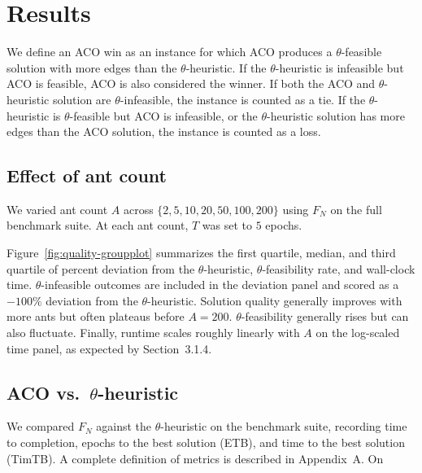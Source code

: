 \documentclass[conference]{IEEEtran}
\begin{document}
\section{Results}


We define an ACO win as an instance for which ACO produces a $\theta$-feasible solution with more edges than the $\theta$-heuristic. If the $\theta$-heuristic is infeasible but ACO is feasible, ACO is also considered the winner. If both the ACO and $\theta$-heuristic solution are $\theta$-infeasible, the instance is counted as a tie. If the $\theta$-heuristic is $\theta$-feasible but ACO is infeasible, or the $\theta$-heuristic solution has more edges than the ACO solution, the instance is counted as a loss.


\subsection{Effect of ant count}


We varied ant count $A$ across $\{2, 5, 10, 20, 50, 100, 200\}$ using $F_N$ on the full benchmark suite. At each ant count, $T$ was set to $5$ epochs.


Figure~\ref{fig:quality-groupplot} summarizes the first quartile, median, and third quartile of percent deviation from the $\theta$-heuristic, $\theta$-feasibility rate, and wall-clock time. $\theta$-infeasible outcomes are included in the deviation panel and scored as a $-100\%$ deviation from the $\theta$-heuristic. Solution quality generally improves with more ants but often plateaus before $A = 200$. $\theta$-feasibility generally rises but can also fluctuate. Finally, runtime scales roughly linearly with $A$ on the log-scaled time panel, as expected by Section~3.1.4.




\subsection{ACO vs.\ $\theta$-heuristic}


We compared $F_N$ against the $\theta$-heuristic on the benchmark suite, recording time to completion, epochs to the best solution (ETB), and time to the best solution (TimTB). A complete definition of metrics is described in Appendix~A. On %
\end{document}
